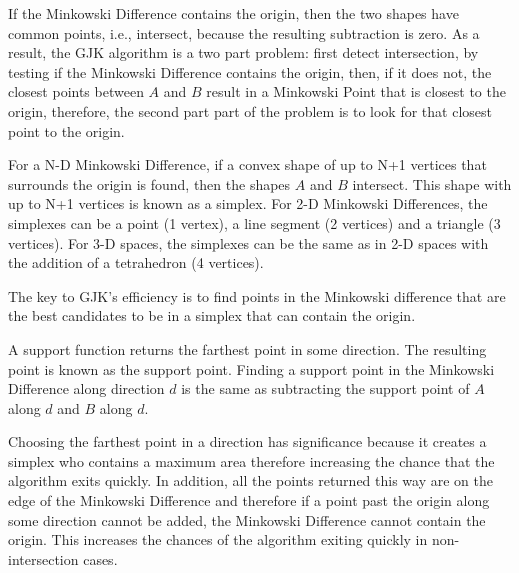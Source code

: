 \par If the Minkowski Difference contains the origin, then the two shapes have common points, i.e., intersect, because the resulting subtraction is zero. As a result, the \ac{GJK} algorithm is a two part problem: first detect intersection, by testing if the Minkowski Difference contains the origin, then, if it does not, the closest points between $A$ and $B$ result in a Minkowski Point that is closest to the origin, therefore, the second part part of the problem is to look for that closest point to the origin.
\par For a N-D Minkowski Difference, if a convex shape of up to N+1 vertices that surrounds the origin is found, then the shapes $A$ and $B$ intersect. This shape with up to N+1 vertices is known as a simplex. For 2-D Minkowski Differences, the simplexes can be a point (1 vertex), a line segment (2 vertices) and a triangle (3 vertices). For 3-D spaces, the simplexes can be the same as in 2-D spaces with the addition of a tetrahedron (4 vertices).
\par The key to \ac{GJK}'s efficiency is to find points in the Minkowski difference that are the best candidates to be in a simplex that can contain the origin. 
\par A support function returns the farthest point in some direction. The resulting point is known as the support point. Finding a support point in the Minkowski Difference along direction $d$ is the same as subtracting the support point of $A$ along $d$ and $B$ along $d$. 
\par Choosing the farthest point in a direction has significance because it creates a simplex who contains a maximum area therefore increasing the chance that the algorithm exits quickly. In addition, all the points returned this way are on the edge of the Minkowski Difference and therefore if a point past the origin along some direction cannot be added, the Minkowski Difference cannot contain the origin. This increases the chances of the algorithm exiting quickly in non-intersection cases.

